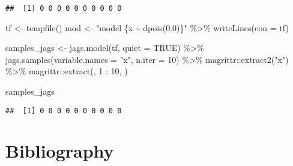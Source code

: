 \documentclass[
  10pt,
  a4paper,
]{article}
\newenvironment{Shaded}{\begin{snugshade}}{\end{snugshade}}
\newcommand{\AttributeTok}[1]{\textcolor[rgb]{0.77,0.63,0.00}{#1}}
\newcommand{\ConstantTok}[1]{\textcolor[rgb]{0.00,0.00,0.00}{#1}}
\newcommand{\DecValTok}[1]{\textcolor[rgb]{0.00,0.00,0.81}{#1}}
\newcommand{\FunctionTok}[1]{\textcolor[rgb]{0.00,0.00,0.00}{#1}}
\newcommand{\NormalTok}[1]{#1}
\newcommand{\OtherTok}[1]{\textcolor[rgb]{0.56,0.35,0.01}{#1}}
\newcommand{\SpecialCharTok}[1]{\textcolor[rgb]{0.00,0.00,0.00}{#1}}
\newcommand{\StringTok}[1]{\textcolor[rgb]{0.31,0.60,0.02}{#1}}
\begin{document}
\begin{verbatim}
##  [1] 0 0 0 0 0 0 0 0 0 0
\end{verbatim}

\begin{Shaded}
\begin{Highlighting}[]
\NormalTok{tf }\OtherTok{\textless{}{-}} \FunctionTok{tempfile}\NormalTok{()}
\NormalTok{mod }\OtherTok{\textless{}{-}} \StringTok{"model \{x \textasciitilde{} dpois(0.0)\}"} \SpecialCharTok{\%\textgreater{}\%}
  \FunctionTok{writeLines}\NormalTok{(}\AttributeTok{con =}\NormalTok{ tf)}

\NormalTok{samples\_jags }\OtherTok{\textless{}{-}} \FunctionTok{jags.model}\NormalTok{(tf, }\AttributeTok{quiet =} \ConstantTok{TRUE}\NormalTok{) }\SpecialCharTok{\%\textgreater{}\%}
  \FunctionTok{jags.samples}\NormalTok{(}\AttributeTok{variable.names =} \StringTok{"x"}\NormalTok{, }\AttributeTok{n.iter =} \DecValTok{10}\NormalTok{) }\SpecialCharTok{\%\textgreater{}\%}
\NormalTok{  magrittr}\SpecialCharTok{::}\FunctionTok{extract2}\NormalTok{(}\StringTok{"x"}\NormalTok{) }\SpecialCharTok{\%\textgreater{}\%}
\NormalTok{  magrittr}\SpecialCharTok{::}\FunctionTok{extract}\NormalTok{(, }\DecValTok{1} \SpecialCharTok{:} \DecValTok{10}\NormalTok{, )}

\NormalTok{samples\_jags}
\end{Highlighting}
\end{Shaded}

\begin{verbatim}
##  [1] 0 0 0 0 0 0 0 0 0 0
\end{verbatim}

\hypertarget{bibliography}{%
\section*{Bibliography}\label{bibliography}}
\end{document}
